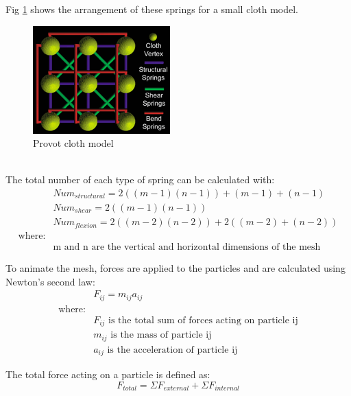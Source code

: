 Fig \ref{fig:provot model} shows the arrangement of these springs for a small cloth model.
\begin{figure}[tp]
   \begin{center}
     \includegraphics{Figures/provot_mesh_structure.png}
   \end{center}
   \caption[Provot cloth model]{Provot cloth model \parencite[2]{Lander2000}}
   \label{fig:provot model}
\end{figure}
\\The total number of each type of spring can be calculated with:
\begin{equation}
\begin{split}
\label{eq:num springs}
  &Num_{structural} = 2((m - 1)(n - 1)) + (m - 1) + (n - 1)
  \\&Num_{shear} = 2((m - 1)(n - 1))
  \\&Num_{flexion} = 2((m - 2)(n - 2)) + 2((m - 2) + (n - 2))
  \\\text{where:}
  \\&\text{m and n are the vertical and horizontal dimensions of the mesh}
  \end{split}
\end{equation}

To animate the mesh, forces are applied to the particles and are calculated using Newton's second law:
\begin{equation}
\begin{split}
\label{eq:newton second law}
  &F_{ij} = m_{ij}a_{ij}
\\\text{where:}
\\&F_{ij}\text{ is the total sum of forces acting on particle ij}
\\&m_{ij}\text{ is the mass of particle ij}
\\&a_{ij}\text{ is the acceleration of particle ij}
\end{split}
\end{equation}

The total force acting on a particle is defined as:
\begin{equation}
\label{eq:total force}
  F_{total} = \Sigma F_{external} + \Sigma F_{internal}
\end{equation}

